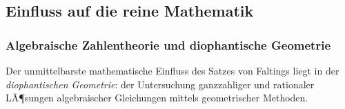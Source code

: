 ﻿\documentclass[12pt,a4paper]{article}
\theoremstyle{plain}
\theoremstyle{definition}
\theoremstyle{remark}
\begin{document}
\subsection{Einfluss auf die reine Mathematik}

\subsubsection{Algebraische Zahlentheorie und diophantische Geometrie}

Der unmittelbarste mathematische Einfluss des Satzes von Faltings liegt in der
\emph{diophantischen Geometrie}: der Untersuchung ganzzahliger und rationaler LÃ¶sungen
algebraischer Gleichungen mittels geometrischer Methoden.
\end{document}
